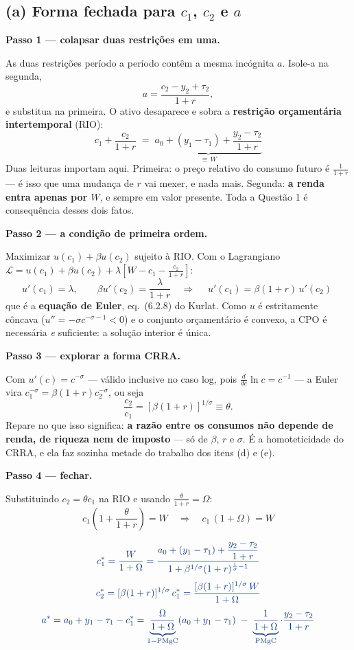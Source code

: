 \documentclass[11pt, a4paper]{article}
\newcommand{\passo}[1]{\medskip\noindent\textbf{#1}\par\nobreak}
\newcommand{\resp}[1]{%
  \ifmmode {\color{darkblue}#1}\else\textcolor{darkblue}{\textbf{#1}}\fi}
\newcommand{\stst}{^{\ast}}
\begin{document}
\subsection*{(a) Forma fechada para $c_1$, $c_2$ e $a$}

\passo{Passo 1 --- colapsar duas restrições em uma.}
As duas restrições período a período contêm a mesma incógnita $a$. Isole-a na segunda,
$$a = \frac{c_2 - y_2 + \tau_2}{1+r},$$
e substitua na primeira. O ativo desaparece e sobra a \textbf{restrição orçamentária
intertemporal} (RIO):
$$\boxed{\;c_1 + \frac{c_2}{1+r} \;=\; \underbrace{a_0 + (y_1-\tau_1)
+ \frac{y_2-\tau_2}{1+r}}_{\textstyle \equiv\, W}\;}$$
Duas leituras importam aqui. Primeira: o preço relativo do consumo futuro é
$\frac{1}{1+r}$ --- é isso que uma mudança de $r$ vai mexer, e nada mais.
Segunda: \textbf{a renda entra apenas por $W$}, e sempre em valor presente. Toda a
Questão 1 é consequência desses dois fatos.

\passo{Passo 2 --- a condição de primeira ordem.}
Maximizar $u(c_1)+\beta u(c_2)$ sujeito à RIO. Com o Lagrangiano
$\mathcal{L}=u(c_1)+\beta u(c_2)+\lambda\!\left[W-c_1-\frac{c_2}{1+r}\right]$:
$$u'(c_1)=\lambda, \qquad \beta u'(c_2)=\frac{\lambda}{1+r}
\quad\Longrightarrow\quad
\boxed{\;u'(c_1)=\beta(1+r)\,u'(c_2)\;}$$
que é a \textbf{equação de Euler}, eq.\ (6.2.8) do Kurlat. Como $u$ é estritamente côncava
($u''=-\sigma c^{-\sigma-1}<0$) e o conjunto orçamentário é convexo, a CPO é necessária
\emph{e} suficiente: a solução interior é única.

\passo{Passo 3 --- explorar a forma CRRA.}
Com $u'(c)=c^{-\sigma}$ --- válido inclusive no caso log, pois $\frac{d}{dc}\ln c = c^{-1}$
--- a Euler vira $c_1^{-\sigma}=\beta(1+r)c_2^{-\sigma}$, ou seja
$$\frac{c_2}{c_1}=[\beta(1+r)]^{1/\sigma}\equiv\theta .$$
Repare no que isso significa: \textbf{a razão entre os consumos não depende de renda, de
riqueza nem de imposto} --- só de $\beta$, $r$ e $\sigma$. É a homoteticidade do CRRA, e ela
faz sozinha metade do trabalho dos itens (d) e (e).

\passo{Passo 4 --- fechar.}
Substituindo $c_2=\theta c_1$ na RIO e usando $\frac{\theta}{1+r}=\Omega$:
$$c_1\left(1+\frac{\theta}{1+r}\right)=W
\quad\Longrightarrow\quad
c_1\,(1+\Omega)=W$$

\begin{tcolorbox}[theorybox, title={Resposta do item (a)}]
$$\resp{c_1\stst = \frac{W}{1+\Omega}
= \frac{a_0+(y_1-\tau_1)+\dfrac{y_2-\tau_2}{1+r}}
       {1+\beta^{1/\sigma}(1+r)^{\frac{1}{\sigma}-1}}}$$
$$\resp{c_2\stst = [\beta(1+r)]^{1/\sigma}\,c_1\stst
= \frac{[\beta(1+r)]^{1/\sigma}\,W}{1+\Omega}}$$
$$\resp{a\stst = a_0+y_1-\tau_1-c_1\stst
= \underbrace{\frac{\Omega}{1+\Omega}}_{1-\mathrm{PMgC}}(a_0+y_1-\tau_1)
 \;-\; \underbrace{\frac{1}{1+\Omega}}_{\mathrm{PMgC}}\cdot\frac{y_2-\tau_2}{1+r}}$$
\end{tcolorbox}
\end{document}
